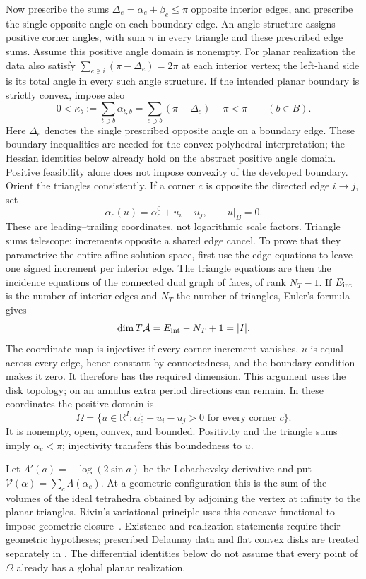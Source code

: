 Now prescribe the sums $\Delta_e=\alpha_e+\beta_e\le\pi$ opposite
interior edges, and prescribe the single opposite angle on each
boundary edge. An angle structure assigns positive corner angles,
with sum $\pi$ in every triangle and these prescribed edge sums.
Assume this positive angle domain is nonempty. For planar realization
the data also satisfy
$\sum_{e\ni i}(\pi-\Delta_e)=2\pi$ at each interior vertex; the
left-hand side is its total angle in every such angle structure.
If the intended planar boundary is strictly convex, impose also
\[
 0<\kappa_b:=\sum_{t\ni b}\alpha_{t,b}
   =\sum_{e\ni b}(\pi-\Delta_e)-\pi<\pi
 \qquad(b\in B).
\]
Here $\Delta_e$ denotes the single prescribed opposite angle on a
boundary edge. These boundary inequalities are needed for the convex
polyhedral interpretation; the Hessian identities below already hold
on the abstract positive angle domain. Positive feasibility alone
does not impose convexity of the developed boundary.
Orient the triangles consistently. If a corner $c$ is opposite the
directed edge $i\to j$, set
\begin{equation}
 \alpha_c(u)=\alpha_c^0+u_i-u_j,\qquad u|_B=0.
 \label{eq:ipolyAngleCoordinates}
\end{equation}
These are leading--trailing coordinates, not logarithmic scale factors.
Triangle sums telescope; increments opposite a shared edge cancel.
To prove that they parametrize the entire affine solution space, first
use the edge equations to leave one signed increment per interior edge.
The triangle equations are then the incidence equations of the connected
dual graph of faces, of rank $N_T-1$. If $E_{\rm int}$ is the number of
interior edges and $N_T$ the number of triangles, Euler's formula gives
\[
 \dim T\mathcal A=E_{\rm int}-N_T+1=|I|.
\]
The coordinate map is injective: if every corner increment vanishes,
$u$ is equal across every edge, hence constant by connectedness, and
the boundary condition makes it zero. It therefore has the required
dimension. This argument uses the disk topology; on an annulus extra
period directions can remain. In these coordinates the positive domain is
\[
 \Omega=\{u\in\mathbb R^I:\alpha_c^0+u_i-u_j>0
                  \text{ for every corner }c\}.
\]
It is nonempty, open, convex, and bounded. Positivity and the triangle
sums imply $\alpha_c<\pi$; injectivity transfers this boundedness to $u$.

Let $\Lambda'(a)=-\log(2\sin a)$ be the Lobachevsky derivative and put
$\mathcal V(\alpha)=\sum_c\Lambda(\alpha_c)$. At a geometric
configuration this is the sum of the volumes of the ideal tetrahedra
obtained by adjoining the vertex at infinity to the planar triangles.
Rivin's variational principle uses this concave functional to impose
geometric closure~\cite{RivinEuclidean,FuterGueritaud}. Existence and
realization statements require their geometric hypotheses; prescribed
Delaunay data and flat convex disks are treated separately in
\cite[Theorems~1.6 and~4.11]{RivinOptimization}. The differential
identities below do not assume that every point of $\Omega$ already
has a global planar realization.

